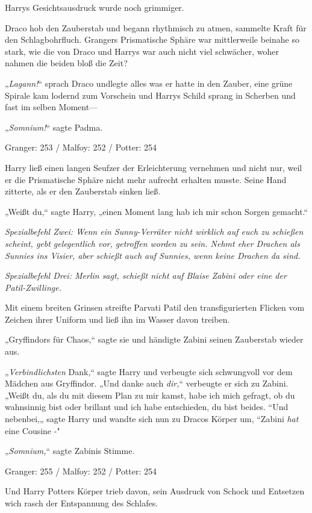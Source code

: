 {Harrys Gesichtsausdruck wurde noch grimmiger.

Draco hob den Zauberstab und begann rhythmisch zu atmen, sammelte Kraft für den Schlagbohrfluch. Grangers Prismatische Sphäre war mittlerweile beinahe so stark, wie die von Draco und Harrys war auch nicht viel schwächer, woher nahmen die beiden bloß die Zeit?

„\emph{Lagann!}“ sprach Draco undlegte alles was er hatte in den Zauber, eine grüne Spirale kam lodernd zum Vorschein und Harrys Schild sprang in Scherben und fast im selben Moment—

„\emph{Somnium!}“ sagte Padma.

\later

Granger: 253 / Malfoy: 252 / Potter: 254

Harry ließ einen langen Seufzer der Erleichterung vernehmen und nicht nur, weil er die Prismatische Sphäre nicht mehr aufrecht erhalten musste. Seine Hand zitterte, als er den Zauberstab sinken ließ.

„Weißt du,“ sagte Harry, „einen Moment lang hab ich mir schon Sorgen gemacht.“

\emph{Spezialbefehl Zwei: Wenn ein Sunny-Verräter nicht wirklich auf euch zu schießen scheint, gebt gelegentlich vor, getroffen worden zu sein. Nehmt eher Drachen als Sunnies ins Visier, aber schießt auch auf Sunnies, wenn keine Drachen da sind.}

\emph{Spezialbefehl Drei: Merlin sagt, schießt nicht auf Blaise Zabini oder eine der Patil-Zwillinge.}

Mit einem breiten Grinsen streifte Parvati Patil den transfigurierten Flicken vom Zeichen ihrer Uniform und ließ ihn im Wasser davon treiben.

„Gryffindors für Chaos,“ sagte sie und händigte Zabini seinen Zauberstab wieder aus.

„\emph{Verbindlichsten} Dank,“ sagte Harry und verbeugte sich schwungvoll vor dem Mädchen aus Gryffindor. „Und danke auch \emph{dir,}“ verbeugte er sich zu Zabini. „Weißt du, als du mit diesem Plan zu mir kamst, habe ich mich gefragt, ob du wahnsinnig bist oder brillant und ich habe entschieden, du bist beides. “Und nebenbei,„ sagte Harry und wandte sich nun zu Dracos Körper um, “Zabini \emph{hat} eine Cousine -"

„\emph{Somnium,}“ sagte Zabinis Stimme.

\later

Granger: 255 / Malfoy: 252 / Potter: 254

Und Harry Potters Körper trieb davon, sein Ausdruck von Schock und Entsetzen wich rasch der Entspannung des Schlafes.

}
